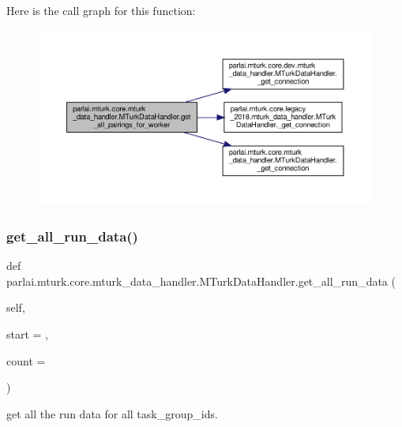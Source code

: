 Here is the call graph for this function\+:
\nopagebreak
\begin{figure}[H]
\begin{center}
\leavevmode
\includegraphics[width=350pt]{classparlai_1_1mturk_1_1core_1_1mturk__data__handler_1_1MTurkDataHandler_af115126a912672f030143d16b281c1d3_cgraph}
\end{center}
\end{figure}
\mbox{\label{classparlai_1_1mturk_1_1core_1_1mturk__data__handler_1_1MTurkDataHandler_a260b4003fe27797a7e49547db992d06e}} 
\subsubsection{\texorpdfstring{get\+\_\+all\+\_\+run\+\_\+data()}{get\_all\_run\_data()}}
{\footnotesize\ttfamily def parlai.\+mturk.\+core.\+mturk\+\_\+data\+\_\+handler.\+M\+Turk\+Data\+Handler.\+get\+\_\+all\+\_\+run\+\_\+data (\begin{DoxyParamCaption}\item[{}]{self,  }\item[{}]{start = {},  }\item[{}]{count = {} }\end{DoxyParamCaption})}

\begin{DoxyVerb}get all the run data for all task_group_ids.\end{DoxyVerb}
 

